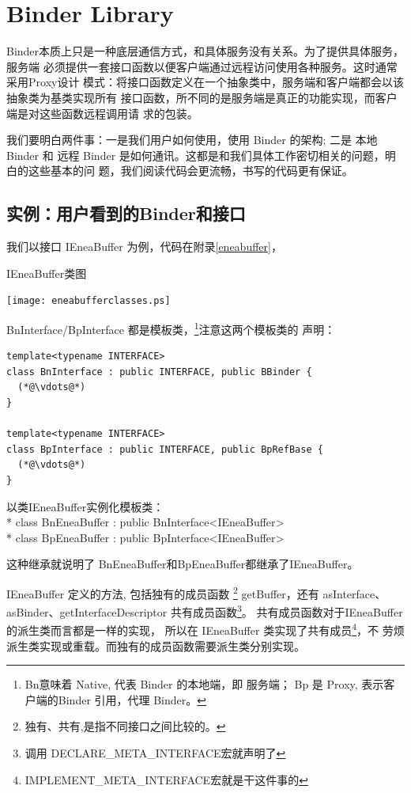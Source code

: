 \documentclass[a4paper,11pt]{article}
\begin{document}
\section{Binder Library}
Binder本质上只是一种底层通信方式，和具体服务没有关系。为了提供具体服务，服务端
必须提供一套接口函数以便客户端通过远程访问使用各种服务。这时通常采用Proxy设计
模式：将接口函数定义在一个抽象类中，服务端和客户端都会以该抽象类为基类实现所有
接口函数，所不同的是服务端是真正的功能实现，而客户端是对这些函数远程调用请
求的包装。

我们要明白两件事：一是我们用户如何使用，使用 Binder 的架构; 二是 本地Binder 和
远程 Binder 是如何通讯。这都是和我们具体工作密切相关的问题，明白的这些基本的问
题，我们阅读代码会更流畅，书写的代码更有保证。

\subsection{实例：用户看到的Binder和接口}

我们以接口 IEneaBuffer 为例，代码在附录\ref{eneabuffer}，

\caption{IEneaBuffer类图}
\texttt{[image: eneabufferclasses.ps]}

BnInterface/BpInterface 都是模板类，\footnote{Bn意味着 Native, 代表 Binder 的本地端，即
服务端； Bp 是 Proxy, 表示客户端的Binder 引用，代理 Binder。}注意这两个模板类的
声明：
\begin{lstlisting}
template<typename INTERFACE>
class BnInterface : public INTERFACE, public BBinder {
  (*@\vdots@*)
}

template<typename INTERFACE>
class BpInterface : public INTERFACE, public BpRefBase {
  (*@\vdots@*)
}
\end{lstlisting}

以类IEneaBuffer实例化模板类：\\*
class BnEneaBuffer : public BnInterface<IEneaBuffer> \\*
class BpEneaBuffer : public BpInterface<IEneaBuffer> 

这种继承就说明了 BnEneaBuffer和BpEneaBuffer都继承了IEneaBuffer。

IEneaBuffer 定义的方法, 包括独有的成员函数
\footnote{独有、共有,是指不同接口之间比较的。} getBuffer，还有 
asInterface、asBinder、getInterfaceDescriptor 共有成员函数\footnote{调用
DECLARE_META_INTERFACE宏就声明了}。
共有成员函数对于IEneaBuffer的派生类而言都是一样的实现，
所以在 IEneaBuffer 类实现了共有成员\footnote{IMPLEMENT_META_INTERFACE宏就是干这件事的}，不
劳烦派生类实现或重载。而独有的成员函数需要派生类分别实现。
\end{document}
